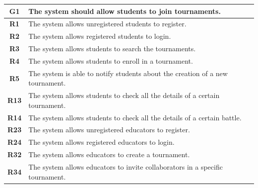 \documentclass[12pt, a4paper]{report}
\begin{document}
    \begin{table}[H]
        \begin{tabularx}{\textwidth}{cX}
        \textbf{G1} & The system should allow students to join tournaments.                             \\
        \hline
        \textbf{R1}  & The system allows unregistered students to register.                             \\
        \textbf{R2}  & The system allows registered students to login.                                  \\
        \textbf{R3}  & The system allows students to search the tournaments.                            \\
        \textbf{R4}  & The system allows students to enroll in a tournament.                            \\
        \textbf{R5}  & The system is able to notify students about the creation of a new tournament.    \\
        \textbf{R13} & The system allows students to check all the details of a certain tournament.     \\
        \textbf{R14} & The system allows students to check all the details of a certain battle.     \\
        \textbf{R23} & The system allows unregistered educators to register.                            \\
        \textbf{R24} & The system allows registered educators to login.                                 \\
        \textbf{R32} & The system allows educators to create a tournament.                              \\
        \textbf{R34} & The system allows educators to invite collaborators in a specific tournament.    \\
        \end{tabularx}
    \end{table}
\end{document}
